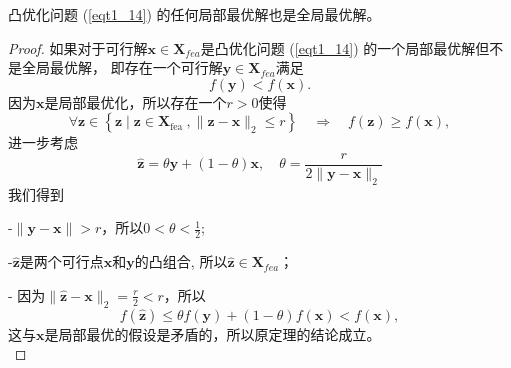 \begin{theorem}
    凸优化问题 (\ref{eqt1_14}) 的任何局部最优解也是全局最优解。
    \label{the1_4}
\end{theorem}
\begin{proof}
    如果对于可行解$  \bm{x} \in \bm{X}_{f e a} $是凸优化问题 (\ref{eqt1_14}) 的一个局部最优解但不是全局最优解， 即存在一个可行解$  \bm{y} \in \bm{X}_{f e a}  $满足
    \begin{equation}
    f(\bm{y})<f(\bm{x}) .
        \nonumber
    \end{equation}
因为$\bm{x}$是局部最优化，所以存在一个$  r>0  $使得
    \begin{equation}
    \forall \bm{z} \in\left\{\bm{z} \mid \bm{z} \in \bm{X}_{\text {fea }},\|\bm{z}-\bm{x}\|_{2} \leq r\right\} \quad \Rightarrow \quad f(\bm{z}) \geq f(\bm{x}),
        \nonumber
    \end{equation}
进一步考虑
\begin{equation}
\hat{\bm{z}}=\theta \bm{y}+(1-\theta) \bm{x}, \quad \theta=\frac{r}{2\|\bm{y}-\bm{x}\|_{2}}
    \nonumber
\end{equation}
我们得到
\par -$  \|\bm{y}-\bm{x}\|>r $，所以$  0<\theta<\frac{1}{2} $;
\par -$  \hat{\bm{z}}  $是两个可行点$\bm{x}$和$\bm{y}$的凸组合, 所以$  \hat{\bm{z}} \in \bm{X}_{f e a} $；
\par - 因为$  \|\hat{\bm{z}}-\bm{x}\|_{2}=\frac{r}{2}<r $，所以
\begin{equation}
f(\hat{\bm{z}}) \leq \theta f(\bm{y})+(1-\theta) f(\bm{x})<f(\bm{x}),
    \nonumber
\end{equation}
这与$\bm{x}$是局部最优的假设是矛盾的，所以原定理的结论成立。\\
\end{proof}
